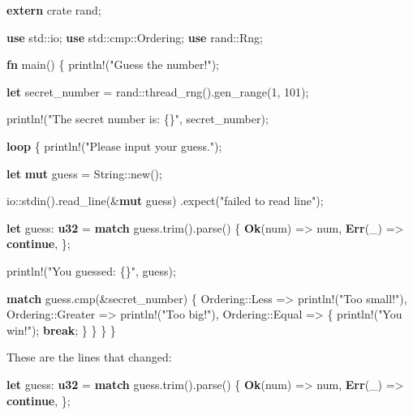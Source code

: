 \documentclass[a4paper,]{book}
\newenvironment{Shaded}{\begin{snugshade}}{\end{snugshade}}
\newcommand{\KeywordTok}[1]{\textcolor[rgb]{0.13,0.29,0.53}{\textbf{{#1}}}}
\newcommand{\DecValTok}[1]{\textcolor[rgb]{0.00,0.00,0.81}{{#1}}}
\newcommand{\StringTok}[1]{\textcolor[rgb]{0.31,0.60,0.02}{{#1}}}
\newcommand{\OtherTok}[1]{\textcolor[rgb]{0.56,0.35,0.01}{{#1}}}
\newcommand{\NormalTok}[1]{{#1}}
\begin{document}
\begin{Shaded}
\begin{Highlighting}[]
\KeywordTok{extern} \NormalTok{crate rand;}

\KeywordTok{use} \NormalTok{std::io;}
\KeywordTok{use} \NormalTok{std::cmp::Ordering;}
\KeywordTok{use} \NormalTok{rand::Rng;}

\KeywordTok{fn} \NormalTok{main() \{}
    \OtherTok{println!}\NormalTok{(}\StringTok{"Guess the number!"}\NormalTok{);}

    \KeywordTok{let} \NormalTok{secret_number = rand::thread_rng().gen_range(}\DecValTok{1}\NormalTok{, }\DecValTok{101}\NormalTok{);}

    \OtherTok{println!}\NormalTok{(}\StringTok{"The secret number is: \{\}"}\NormalTok{, secret_number);}

    \KeywordTok{loop} \NormalTok{\{}
        \OtherTok{println!}\NormalTok{(}\StringTok{"Please input your guess."}\NormalTok{);}

        \KeywordTok{let} \KeywordTok{mut} \NormalTok{guess = String::new();}

        \NormalTok{io::stdin().read_line(&}\KeywordTok{mut} \NormalTok{guess)}
            \NormalTok{.expect(}\StringTok{"failed to read line"}\NormalTok{);}

        \KeywordTok{let} \NormalTok{guess: }\KeywordTok{u32} \NormalTok{= }\KeywordTok{match} \NormalTok{guess.trim().parse() \{}
            \KeywordTok{Ok}\NormalTok{(num) => num,}
            \KeywordTok{Err}\NormalTok{(_) => }\KeywordTok{continue}\NormalTok{,}
        \NormalTok{\};}

        \OtherTok{println!}\NormalTok{(}\StringTok{"You guessed: \{\}"}\NormalTok{, guess);}

        \KeywordTok{match} \NormalTok{guess.cmp(&secret_number) \{}
            \NormalTok{Ordering::Less    => }\OtherTok{println!}\NormalTok{(}\StringTok{"Too small!"}\NormalTok{),}
            \NormalTok{Ordering::Greater => }\OtherTok{println!}\NormalTok{(}\StringTok{"Too big!"}\NormalTok{),}
            \NormalTok{Ordering::Equal   => \{}
                \OtherTok{println!}\NormalTok{(}\StringTok{"You win!"}\NormalTok{);}
                \KeywordTok{break}\NormalTok{;}
            \NormalTok{\}}
        \NormalTok{\}}
    \NormalTok{\}}
\NormalTok{\}}
\end{Highlighting}
\end{Shaded}

These are the lines that changed:

\begin{Shaded}
\begin{Highlighting}[]
\KeywordTok{let} \NormalTok{guess: }\KeywordTok{u32} \NormalTok{= }\KeywordTok{match} \NormalTok{guess.trim().parse() \{}
    \KeywordTok{Ok}\NormalTok{(num) => num,}
    \KeywordTok{Err}\NormalTok{(_) => }\KeywordTok{continue}\NormalTok{,}
\NormalTok{\};}
\end{Highlighting}
\end{Shaded}
\end{document}
